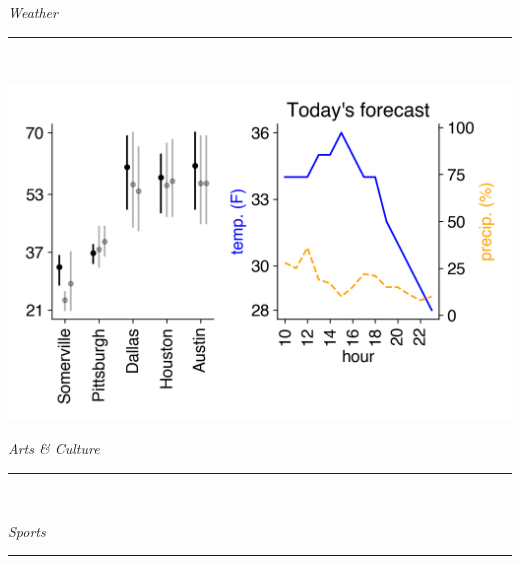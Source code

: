 \documentclass[landscape]{article}
\date{\today}
\renewcommand\headline[1]{\begin{center} {\huge \textsl{ #1}}\\ %
			\rule[5pt]{0.8\hsize}{0.5pt}\\ \end{center}}
\begin{document}
\maketitle

\begin{multicols}{3}
\headline{Weather}
\vspace{-0.5cm}\includegraphics[width=\linewidth]{images/weather.png}

\headline{Arts \& Culture}
\vspace{-0.3cm}


\noindent

\headline{Sports}
\vspace{-0.3cm}



\end{multicols}
\end{document}

